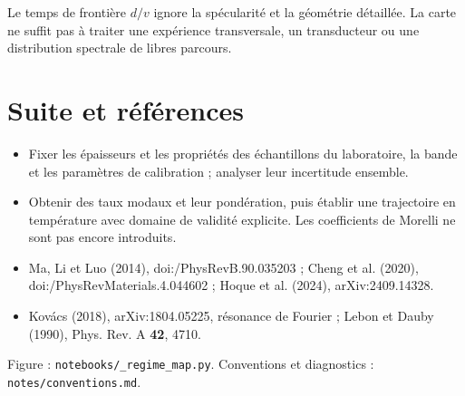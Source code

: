 \documentclass[11pt,a4paper]{article}
\begin{document}
Le temps de frontière $d/v$ ignore la spécularité et la géométrie détaillée.
La carte ne suffit pas à traiter une expérience transversale, un transducteur
ou une distribution spectrale de libres parcours.

\section{Suite et références}
\begin{itemize}
\item Fixer les épaisseurs et les propriétés des échantillons du laboratoire,
la bande et les paramètres de calibration ; analyser leur incertitude ensemble.
\item Obtenir des taux modaux et leur pondération, puis établir une trajectoire
en température avec domaine de validité explicite. Les coefficients de Morelli
ne sont pas encore introduits.
\item Ma, Li et Luo (2014), doi:/\allowbreak PhysRevB.90.035203 ;
Cheng et al. (2020), doi:/\allowbreak PhysRevMaterials.4.044602 ;
Hoque et al. (2024), arXiv:2409.14328.
\item Kovács (2018), arXiv:1804.05225, résonance de Fourier ;
Lebon et Dauby (1990), Phys. Rev. A \textbf{42}, 4710.
\end{itemize}
\noindent\small Figure : \texttt{notebooks/\_\allowbreak regime\_\allowbreak map.py}.
Conventions et diagnostics : \texttt{notes/\allowbreak conventions.md}.
\end{document}
